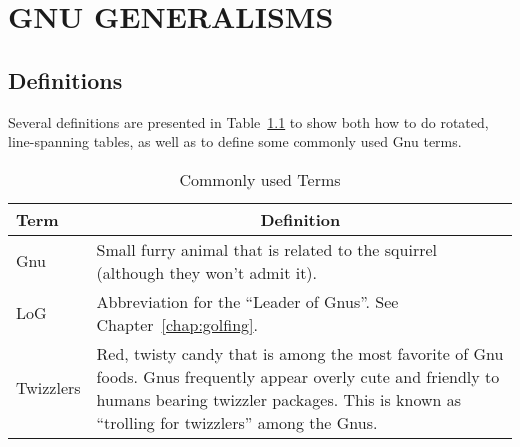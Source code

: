 %
%
%
%
%
%
%
%

%
%

\chapter{GNU GENERALISMS}

\section{Definitions}

Several definitions are presented in Table~\ref{tbl:defs} to show both
how to do rotated, line-spanning tables, as well as to define some
commonly used Gnu terms.

\begin{landscape}
\begin{table}
\centering
\caption{Commonly used  Terms \label{tbl:defs}}
\begin{tabular}{lp{5in}}
\toprule
Term & \multicolumn{1}{c}{Definition} \\
\midrule
Gnu & Small furry animal that is related to the squirrel 
(although they won't admit it). \\
LoG & Abbreviation for the ``Leader of Gnus''.  See
Chapter~\ref{chap:golfing}. \\
Twizzlers & Red, twisty candy that is among the most favorite of Gnu
foods.  Gnus frequently appear overly cute and friendly to humans
bearing twizzler packages.  This is known as ``trolling for twizzlers''
among the Gnus. \\
\bottomrule
\end{tabular}
\end{table}
\end{landscape}

